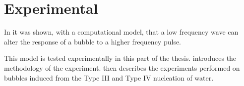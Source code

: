 


\part{Experimental}\label{part:experimental}

\begin{quote}

\end{quote}



In  it was shown, with a computational model,
that a low frequency wave can alter the response of a bubble to a higher frequency pulse.

This model is tested experimentally in this part of the thesis.
 introduces the methodology of the experiment.
then describes the experiments performed on %
bubbles induced from the Type III and Type IV nucleation  of water.



